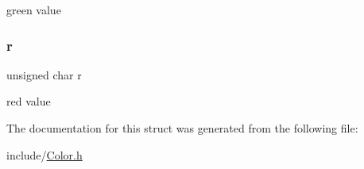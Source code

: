 green value \mbox{\label{struct_color_afd7b1ea9ff115205b65e0bffc92946ac}} 
\subsubsection{\texorpdfstring{r}{r}}
{\footnotesize\ttfamily unsigned char r}

red value 

The documentation for this struct was generated from the following file\+:\begin{DoxyCompactItemize}
\item 
include/\hyperlink{_color_8h}{Color.\+h}\end{DoxyCompactItemize}
